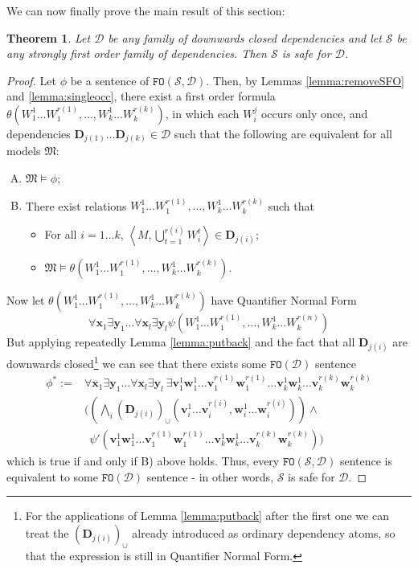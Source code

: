\documentclass{article}
\newtheorem{Theorem}{Theorem}[section]
\theoremstyle{definition}
\newcommand{\tuple}{\mathbf}
\newcommand{\FO}{\texttt{FO}}
\newcommand{\M}{\mathfrak M}
\newcommand{\D}{\mathbf D}
\newcommand{\DD}{\mathcal D}
\newcommand{\SSd}{\mathcal S}
\begin{document}
We can now finally prove the main result of this section: 
\begin{Theorem}
	Let $\DD$ be any family of downwards closed dependencies and let $\SSd$ be any strongly first order family of dependencies. Then $\SSd$ is safe for $\DD$. 
\label{thm:safe}
\end{Theorem}
\begin{proof}
	Let $\phi$ be a sentence of $\FO(\SSd, \DD)$. Then, by Lemmas \ref{lemma:removeSFO} and \ref{lemma:singleocc}, there exist a first order formula $\theta(W_1^1 \ldots W_1^{r(1)}, \ldots, W_k^1 \ldots W_k^{r(k)})$, in which each $W_i^j$ occurs only once, and dependencies $\D_{j(1)} \ldots \D_{j(k)}\in \DD$ such that the following are equivalent for all models $\M$:
	\begin{enumerate}[A)]
	\item  $\M \models \phi$; 
	\item There exist relations $W_1^1 \ldots W_1^{r(1)}, \ldots, W_k^1 \ldots W_k^{r(k)}$ such that
	\begin{itemize}
		\item For all $i = 1 \ldots k$, $\left \langle M, \bigcup_{t=1}^{r(i)} W_i^t\right\rangle \in \D_{j(i)}$;
		\item $\M \models \theta(W_1^1 \ldots W_1^{r(1)}, \ldots, W_k^1 \ldots W_k^{r(k)})$. 
	\end{itemize}
	\end{enumerate}

	Now let $\theta(W_1^1 \ldots W_1^{r(1)}, \ldots, W_k^1 \ldots W_k^{r(k)})$ have Quantifier Normal Form 
	\[
		\forall \tuple x_1 \exists \tuple y_1 \ldots \forall \tuple x_l \exists \tuple y_l \psi(W_1^1 \ldots W_1^{r(1)}, \ldots, W_k^1 \ldots W_k^{r(n)})
	\]
	But applying repeatedly Lemma \ref{lemma:putback} and the fact that all $\D_{j(i)}$ are downwards closed\footnote{For the applications of Lemma \ref{lemma:putback} after the first one we can treat the $(\D_{j(i)})_\cup$ already introduced as ordinary dependency atoms, so that the expression is still in Quantifier Normal Form.} we can see that there exists some $\FO(\DD)$ sentence 
\begin{align*}
\phi^* := & \forall \tuple x_1 \exists \tuple y_1 \ldots \forall \tuple x_l \exists \tuple y_l ~  \exists \tuple v_1^1 \tuple w_1^1 \ldots \tuple v_1^{r(1)} \tuple w_1^{r(1)} \ldots \tuple v_k^1 \tuple w_k^1 \ldots \tuple v_k^{r(k)} \tuple w_k^{r(k)}\\
&  (
(\bigwedge_i (\D_{j(i)})_\cup(\tuple v_i^1 \ldots \tuple v_i^{r(i)}, \tuple w_i^1 \ldots \tuple w_i^{r(i)})) \wedge\\
& ~~\psi'(\tuple v_1^1 \tuple w_1^1 \ldots \tuple v_1^{r(1)} \tuple w_1^{r(1)} \ldots 
\tuple v_k^1 \tuple w_k^1 \ldots \tuple v_k^{r(k)} \tuple w_k^{r(k)})
)
\end{align*}
 which is true if and only if B) above holds. Thus, every $\FO(\SSd, \DD)$ sentence is equivalent to some $\FO(\DD)$ sentence - in other words, $\SSd$ is safe for $\DD$. 
\end{proof}
\end{document}
